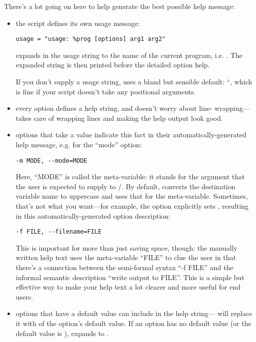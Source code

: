 There's a lot going on here to help  generate the best possible
help message:
\begin{itemize}
\item {} 
the script defines its own usage message:
\begin{verbatim}
usage = "usage: %prog [options] arg1 arg2"
\end{verbatim}

 expands  in the usage string to the name of the current
program, i.e. .  The expanded string
is then printed before the detailed option help.

If you don't supply a usage string,  uses a bland but sensible
default: ``, which is fine if your script
doesn't take any positional arguments.

\item {} 
every option defines a help string, and doesn't worry about line-
wrapping{---} takes care of wrapping lines and making the
help output look good.

\item {} 
options that take a value indicate this fact in their
automatically-generated help message, e.g. for the ``mode'' option:
\begin{verbatim}
-m MODE, --mode=MODE
\end{verbatim}

Here, ``MODE'' is called the meta-variable: it stands for the argument
that the user is expected to supply to /.  By default,
 converts the destination variable name to uppercase and uses
that for the meta-variable.  Sometimes, that's not what you want{---}for example, the  option explicitly sets
, resulting in this automatically-generated option
description:
\begin{verbatim}
-f FILE, --filename=FILE
\end{verbatim}

This is important for more than just saving space, though: the
manually written help text uses the meta-variable ``FILE'' to clue the
user in that there's a connection between the semi-formal syntax ``-f
FILE'' and the informal semantic description ``write output to FILE''.
This is a simple but effective way to make your help text a lot
clearer and more useful for end users.

\item {} 
options that have a default value can include  in
the help string{---} will replace it with  of the
option's default value.  If an option has no default value (or the
default value is ),  expands to .

\end{itemize}


